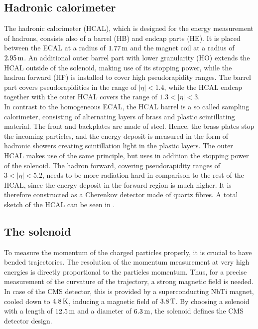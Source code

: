 \subsection{Hadronic calorimeter}
The hadronic calorimeter (HCAL), which is designed for the energy measurement of hadrons, consists also of a barrel (HB) and endcap parts (HE). It is placed between the ECAL at a radius of $1.77\,\text{m}$ and the magnet coil at a radius of $2.95\,\text{m}$. An additional outer barrel part with lower granularity (HO) extends the HCAL outside of the solenoid, making use of its stopping power, while the hadron forward (HF) is installed to cover high pseudorapidity ranges. The barrel part covers pseudorapidities in the range of $|\eta|<1.4$, while the HCAL endcap together with the outer HCAL covers the range of $1.3<|\eta|<3$.\\
In contrast to the homogeneous ECAL, the HCAL barrel is a so called sampling calorimeter, consisting of alternating layers of brass and plastic scintillating material. The front and backplates are made of steel. Hence, the brass plates stop the incoming particles, and the energy deposit is measured in the form of hadronic showers creating scintillation light in the plastic layers. The outer HCAL makes use of the same principle, but uses in addition the stopping power of the solenoid. The hadron forward, covering pseudorapidity ranges of $3<|\eta|<5.2$, needs to be more radiation hard in comparison to the rest of the HCAL, since the energy deposit in the forward region is much higher. It is therefore constructed as a Cherenkov detector made of quartz fibres. A total sketch of the HCAL can be seen in .

\subsection{The solenoid}
To measure the momentum of the  charged particles properly, it is crucial to have bended trajectories. The resolution of the momentum measurement at very high energies is directly proportional to the particles momentum. Thus, for a precise measurement of the curvature of the trajectory, a strong magnetic field is needed. In case of the CMS detector, this is provided by a superconducting NbTi magnet, cooled down to $4.8\,\text{K}$, inducing a magnetic field of $3.8\,\text{T}$. By choosing a solenoid with a length of $12.5\,\text{m}$ and a diameter of $6.3\,\text{m}$, the solenoid defines the CMS detector design.

